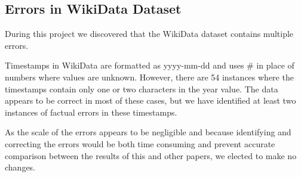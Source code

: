 \subsection{Errors in WikiData Dataset}
During this project we discovered that the WikiData dataset contains multiple errors.

Timestamps in WikiData are formatted as yyyy-mm-dd 
and uses \# in place of numbers where values are unknown.
However, there are 54 instances where the timestamps contain only one or two characters in the year value. The data appears to be correct in most of these cases, but we have identified at least two instances of factual errors in these timestamps.






As the scale of the errors appears to be negligible and because identifying and correcting the errors would be both time consuming and prevent accurate comparison between the results of this and other papers, we elected to make no changes.